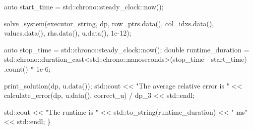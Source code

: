 \begin{DoxyCodeInclude}
    \textcolor{keyword}{auto} start\_time = std::chrono::steady\_clock::now();

    solve\_system(executor\_string, dp, row\_ptrs.data(), col\_idxs.data(),
                 values.data(), rhs.data(), u.data(), 1e-12);

    \textcolor{keyword}{auto} stop\_time = std::chrono::steady\_clock::now();
    \textcolor{keywordtype}{double} runtime\_duration =
        std::chrono::duration\_cast<std::chrono::nanoseconds>(stop\_time -
                                                             start\_time)
            .count() *
        1e-6;

    print\_solution(dp, u.data());
    std::cout << \textcolor{stringliteral}{"The average relative error is "}
              << calculate\_error(dp, u.data(), correct\_u) / dp\_3 << std::endl;

    std::cout << \textcolor{stringliteral}{"The runtime is "} << std::to\_string(runtime\_duration) << \textcolor{stringliteral}{" ms"}
              << std::endl;
\}
\end{DoxyCodeInclude}
 